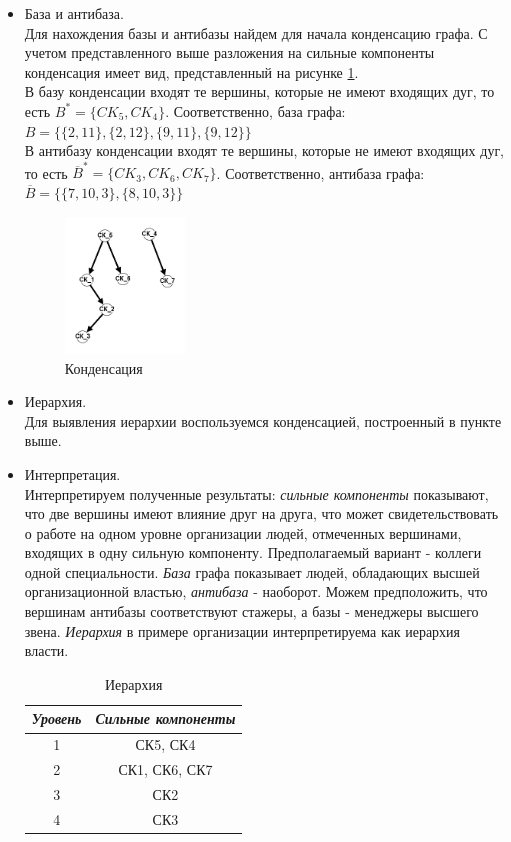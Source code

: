 \documentclass{article}
\begin{document}
\begin{enumerate}
\begin{itemize}
    \item База и антибаза.\\
    Для нахождения базы и антибазы найдем для начала конденсацию графа. С учетом представленного выше разложения на сильные компоненты конденсация имеет вид, представленный на рисунке \ref{fig:1_condenc}. \\
    В базу конденсации входят те вершины, которые не имеют входящих дуг, то есть $B^* = \{CK_5,CK_4\}$. Соответственно, база графа:
    $B = \{\{2,11\},\{2,12\},\{9,11\},\{9,12\}\}$ \\
    В антибазу конденсации входят те вершины, которые не имеют входящих дуг, то есть $\overline{B}^* = \{CK_3,CK_6,CK_7\}$. Соответственно, антибаза графа: $\overline{B} = \{\{7,10,3\},
    \{8,10,3\}\}$
\begin{figure}[h]
    \includegraphics[width=0.3\textwidth, center]{attachments/1/condens_1.png}
    \caption{Конденсация}
    \label{fig:1_condenc}
\end{figure}
    \item Иерархия.\\
    Для выявления иерархии воспользуемся конденсацией, построенный в пункте выше.
    \item Интерпретация.\\
    Интерпретируем полученные результаты: \textit{сильные компоненты} показывают, что две вершины имеют влияние друг на друга, что может свидетельствовать о работе на одном уровне организации людей, отмеченных вершинами, входящих в одну сильную компоненту. Предполагаемый вариант - коллеги одной специальности.
    \textit{База} графа показывает людей, обладающих высшей организационной властью, \textit{антибаза} - наоборот. Можем предположить, что вершинам антибазы соответствуют стажеры, а базы - менеджеры высшего звена.
    \textit{Иерархия} в примере организации интерпретируема как иерархия власти.

    
\begin{table}[ht]
    \centering
    \begin{tabular}{c|c}
    \hline
    \textit{Уровень} & \textit{Сильные компоненты} \\ \hline
    1 & СК5, СК4 \\
    2 & СК1, СК6, СК7 \\
    3 & СК2 \\
    4 & СК3 \\ \hline
    \end{tabular}
    \caption{Иерархия}
    \label{tab:1_ierarchy}
\end{table}


\end{itemize}
\end{enumerate}
\end{document}
